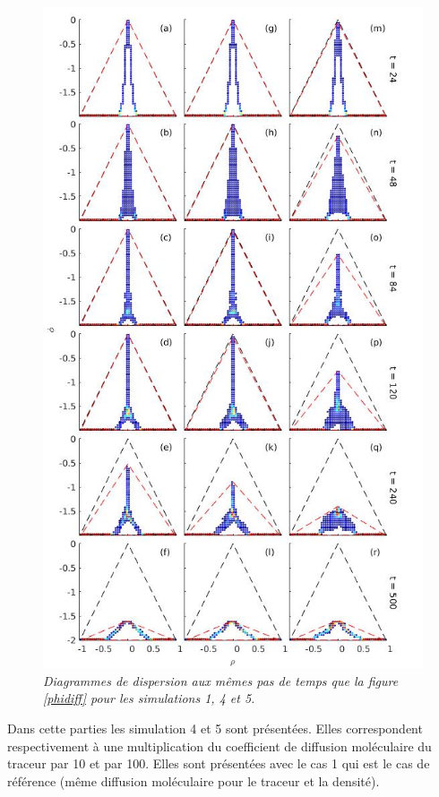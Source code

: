 \documentclass[a4paper,12pt]{article}
\begin{document}
    \begin{figure}[!h]
        \centering
        \includegraphics[width=0.7\linewidth]{figures/scatterplot_phidiff.jpg}
        \caption{\textit{Diagrammes de dispersion aux mêmes pas de temps que la figure \ref{phidiff} pour les simulations 1, 4 et 5.}}
        \label{scatterplot_phi}
    \end{figure}
    Dans cette parties les simulation 4 et 5 sont présentées. Elles correspondent respectivement à une multiplication du coefficient de diffusion moléculaire du traceur par 10 et par 100. Elles sont présentées avec le cas 1 qui est le cas de référence (même diffusion moléculaire pour le traceur et la densité).
\end{document}
